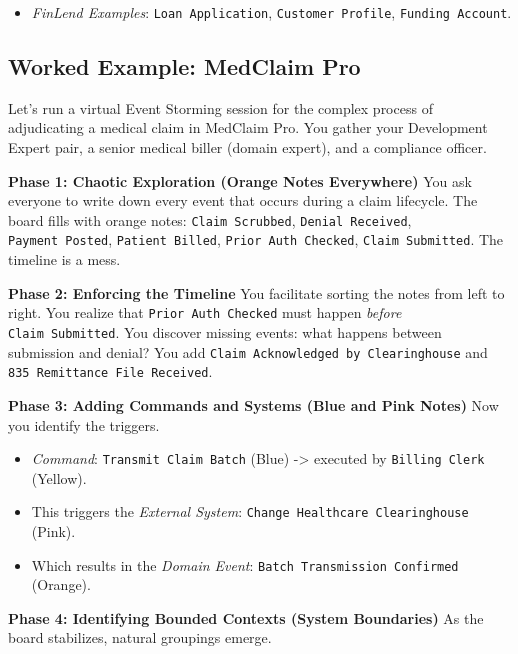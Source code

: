 \documentclass[
  11pt,
  openany,
  oneside]{book}
\providecommand{\tightlist}{%
  \setlength{\itemsep}{0pt}\setlength{\parskip}{0pt}}
\begin{document}
\begin{enumerate}
  \begin{itemize}
  \tightlist
  \item
    \emph{FinLend Examples}: \texttt{Loan\ Application},
    \texttt{Customer\ Profile}, \texttt{Funding\ Account}.
  \end{itemize}
\end{enumerate}

\subsection{Worked Example: MedClaim
Pro}\label{worked-example-medclaim-pro}

Let's run a virtual Event Storming session for the complex process of
adjudicating a medical claim in MedClaim Pro. You gather your
Development Expert pair, a senior medical biller (domain expert), and a
compliance officer.

\textbf{Phase 1: Chaotic Exploration (Orange Notes Everywhere)} You ask
everyone to write down every event that occurs during a claim lifecycle.
The board fills with orange notes: \texttt{Claim\ Scrubbed},
\texttt{Denial\ Received}, \texttt{Payment\ Posted},
\texttt{Patient\ Billed}, \texttt{Prior\ Auth\ Checked},
\texttt{Claim\ Submitted}. The timeline is a mess.

\textbf{Phase 2: Enforcing the Timeline} You facilitate sorting the
notes from left to right. You realize that \texttt{Prior\ Auth\ Checked}
must happen \emph{before} \texttt{Claim\ Submitted}. You discover
missing events: what happens between submission and denial? You add
\texttt{Claim\ Acknowledged\ by\ Clearinghouse} and
\texttt{835\ Remittance\ File\ Received}.

\textbf{Phase 3: Adding Commands and Systems (Blue and Pink Notes)} Now
you identify the triggers.

\begin{itemize}
\tightlist
\item
  \emph{Command}: \texttt{Transmit\ Claim\ Batch} (Blue) -\textgreater{}
  executed by \texttt{Billing\ Clerk} (Yellow).
\item
  This triggers the \emph{External System}:
  \texttt{Change\ Healthcare\ Clearinghouse} (Pink).
\item
  Which results in the \emph{Domain Event}:
  \texttt{Batch\ Transmission\ Confirmed} (Orange).
\end{itemize}

\textbf{Phase 4: Identifying Bounded Contexts (System Boundaries)} As
the board stabilizes, natural groupings emerge.
\end{document}
